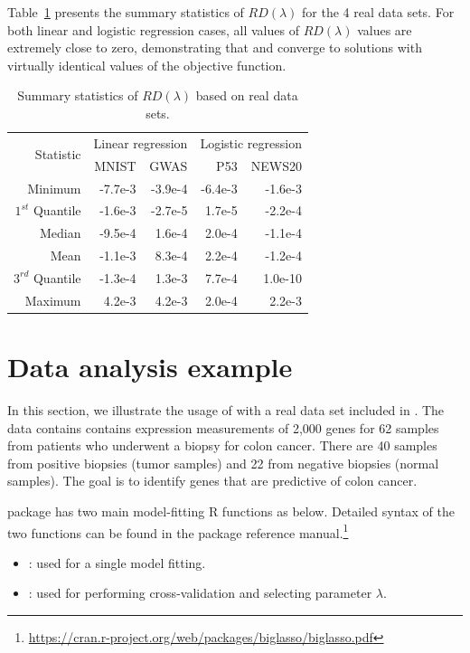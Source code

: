 Table~\ref{tab_real_valid} presents the summary statistics of $RD(\lambda)$ for the 4 real data sets. For both linear and logistic regression cases, all values of $RD(\lambda)$ values are extremely close to zero, demonstrating that  and  converge to solutions with virtually identical values of the objective function.

\begin{table}[htbp]
\centering
  \begin{tabular}{r|rr|rr}
    \toprule
    \multirow{2}{*}{Statistic} &
      \multicolumn{2}{c|}{Linear regression} &
      \multicolumn{2}{c}{Logistic regression} \\
    	  & MNIST & GWAS & P53 & NEWS20 \\
      \midrule
    Minimum           & -7.7e-3 & -3.9e-4 & -6.4e-3 & -1.6e-3  \\
    $1^{st}$ Quantile & -1.6e-3 & -2.7e-5 &  1.7e-5 & -2.2e-4  \\
    Median            & -9.5e-4 &  1.6e-4 &  2.0e-4 & -1.1e-4  \\
    Mean              & -1.1e-3 &  8.3e-4 &  2.2e-4 & -1.2e-4  \\
    $3^{rd}$ Quantile & -1.3e-4 &  1.3e-3 &  7.7e-4 &  1.0e-10 \\
    Maximum           &  4.2e-3 &  4.2e-3 &  2.0e-4 &  2.2e-3  \\
    \bottomrule
  \end{tabular}
\caption{Summary statistics of $RD(\lambda)$ based on real data sets.}
\label{tab_real_valid}
\end{table}

\section{Data analysis example}

In this section, we illustrate the usage of  with a real data set  included in . The  data contains contains expression measurements of 2,000 genes for 62 samples from patients who underwent a biopsy for colon cancer. There are 40 samples from positive biopsies (tumor samples) and 22 from negative biopsies (normal samples). The goal is to identify genes that are predictive of colon cancer.

 package has two main model-fitting R functions as below. Detailed syntax of the two functions can be found in the package reference manual.\footnote{\url{https://cran.r-project.org/web/packages/biglasso/biglasso.pdf}}
\begin{itemize}
\item {}: used for a single model fitting.
\item {}: used for performing cross-validation and selecting parameter $\lambda$.
\end{itemize}

